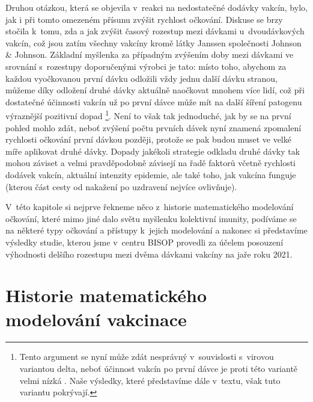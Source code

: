 Druhou otázkou, která se objevila v~reakci na nedostatečné dodávky vakcín, bylo, jak i při tomto omezeném přísunu zvýšit rychlost očkování. Diskuse se brzy stočila k~tomu, zda a jak zvýšit časový rozestup mezi dávkami u~dvoudávkových vakcín, což jsou zatím všechny vakcíny kromě látky Janssen společnosti Johnson \& Johnson. Základní myšlenka za případným zvýšením doby mezi dávkami ve srovnání s~rozestupy doporučenými výrobci je tato: místo toho, abychom za každou vyočkovanou první dávku odložili vždy jednu další dávku stranou, můžeme díky odložení druhé dávky aktuálně naočkovat mnohem více lidí, což při dostatečné účinnosti vakcín už po první dávce může mít na další šíření patogenu výraznější pozitivní dopad \cite{Paltiel_etal2021,Tuite_etal2021}\footnote{Tento argument se nyní může zdát nesprávný v~souvislosti s~virovou variantou delta, neboť účinnost vakcín po první dávce je proti této variantě velmi nízká \cite{delta}. Naše výsledky, které představíme dále v~textu, však tuto variantu pokrývají.}. Není to však tak jednoduché, jak by se na první pohled mohlo zdát, neboť zvýšení počtu prvních dávek nyní znamená zpomalení rychlosti očkování první dávkou později, protože se pak budou muset ve velké míře aplikovat druhé dávky. Dopady jakékoli strategie odkladu druhé dávky tak mohou záviset a velmi pravděpodobně závisejí na řadě faktorů včetně rychlosti dodávek vakcín, aktuální intenzity epidemie, ale také toho, jak vakcína funguje (kterou část cesty od nakažení po uzdravení nejvíce ovlivňuje). 

V~této kapitole si nejprve řekneme něco z~historie matematického modelování očkování, které mimo jiné dalo světu myšlenku kolektivní imunity, podíváme se na některé typy očkování a přístupy k~jejich modelování a nakonec si představíme výsledky studie, kterou jsme v~centru BISOP provedli za účelem posouzení vý\-hod\-nos\-ti delšího rozestupu mezi dvěma dávkami vakcíny na jaře roku 2021.

\section*{Historie matematického modelování vakcinace}

